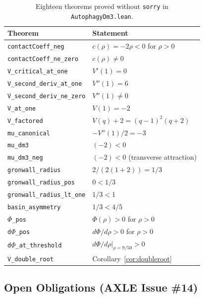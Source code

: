 \documentclass[12pt,a4paper]{article}
\begin{document}
\begin{table}[h]
\centering
\small
\caption{Eighteen theorems proved without \texttt{sorry} in
\texttt{AutophagyDm3.lean}.}
\label{tab:lean}
\begin{tabular}{ll}
\toprule
Theorem & Statement \\
\midrule
\texttt{contactCoeff\_neg}       & $c(\rho) = -2\rho < 0$ for $\rho > 0$ \\
\texttt{contactCoeff\_ne\_zero}  & $c(\rho) \neq 0$ \\
\texttt{V\_critical\_at\_one}    & $V'(1) = 0$ \\
\texttt{V\_second\_deriv\_at\_one} & $V''(1) = 6$ \\
\texttt{V\_second\_deriv\_ne\_zero} & $V''(1) \neq 0$ \\
\texttt{V\_at\_one}              & $V(1) = -2$ \\
\texttt{V\_factored}             & $V(q)+2 = (q-1)^2(q+2)$ \\
\texttt{mu\_canonical}           & $-V''(1)/2 = -3$ \\
\texttt{mu\_dm3}                 & $(-2) < 0$ \\
\texttt{mu\_dm3\_neg}            & $(-2) < 0$ (transverse attraction) \\
\texttt{gronwall\_radius}        & $2/(2(1+2)) = 1/3$ \\
\texttt{gronwall\_radius\_pos}   & $0 < 1/3$ \\
\texttt{gronwall\_radius\_lt\_one} & $1/3 < 1$ \\
\texttt{basin\_asymmetry}        & $1/3 < 4/5$ \\
\texttt{$\Phi$\_pos}             & $\Phi(\rho) > 0$ for $\rho > 0$ \\
\texttt{d$\Phi$\_pos}            & $d\Phi/d\rho > 0$ for $\rho > 0$ \\
\texttt{d$\Phi$\_at\_threshold}  & $d\Phi/d\rho|_{\rho=9/50} > 0$ \\
\texttt{V\_double\_root}         & Corollary~\ref{cor:doubleroot} \\
\bottomrule
\end{tabular}
\end{table}

\subsection*{Open Obligations (AXLE Issue \#14)}
\end{document}
